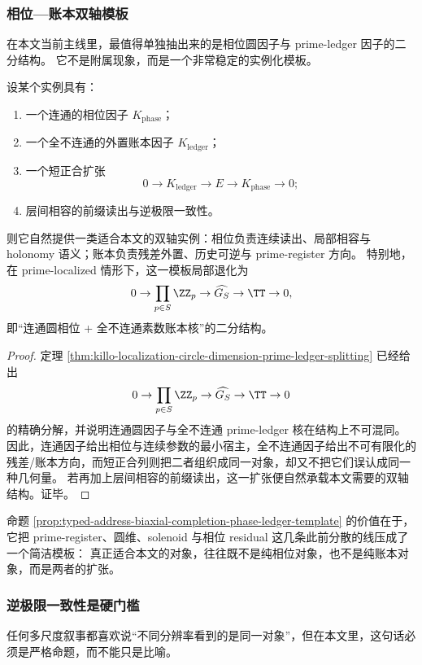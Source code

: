 \subsubsection{相位—账本双轴模板}\label{subsubsec:typed-address-biaxial-completion-phase-ledger-template}
在本文当前主线里，最值得单独抽出来的是相位圆因子与 prime-ledger 因子的二分结构。
它不是附属现象，而是一个非常稳定的实例化模板。

\begin{proposition}[相位—账本双轴模板]\label{prop:typed-address-biaxial-completion-phase-ledger-template}
设某个实例具有：
\begin{enumerate}
  \item 一个连通的相位因子 \(K_{\mathrm{phase}}\)；
  \item 一个全不连通的外置账本因子 \(K_{\mathrm{ledger}}\)；
  \item 一个短正合扩张
  \[
  0\to K_{\mathrm{ledger}}\to E\to K_{\mathrm{phase}}\to 0;
  \]
  \item 层间相容的前缀读出与逆极限一致性。
\end{enumerate}
则它自然提供一类适合本文的双轴实例：相位负责连续读出、局部相容与 holonomy 语义；账本负责残差外置、历史可逆与 prime-register 方向。
特别地，在 prime-localized 情形下，这一模板局部退化为
\[
0\to \prod_{p\in S}\ZZ_p\to \widehat{G_S}\to \TT\to 0,
\]
即“连通圆相位 + 全不连通素数账本核”的二分结构。
\end{proposition}

\begin{proof}
定理 \ref{thm:killo-localization-circle-dimension-prime-ledger-splitting} 已经给出
\[
0\to \prod_{p\in S}\ZZ_p\to \widehat{G_S}\to \TT\to 0
\]
的精确分解，并说明连通圆因子与全不连通 prime-ledger 核在结构上不可混同。
因此，连通因子给出相位与连续参数的最小宿主，全不连通因子给出不可有限化的残差/账本方向，而短正合列则把二者组织成同一对象，却又不把它们误认成同一种几何量。
若再加上层间相容的前缀读出，这一扩张便自然承载本文需要的双轴结构。证毕。
\end{proof}

命题 \ref{prop:typed-address-biaxial-completion-phase-ledger-template} 的价值在于，它把 prime-register、圆维、solenoid 与相位 residual 这几条此前分散的线压成了一个简洁模板：
真正适合本文的对象，往往既不是纯相位对象，也不是纯账本对象，而是两者的扩张。

\subsubsection{逆极限一致性是硬门槛}\label{subsubsec:typed-address-biaxial-completion-inverse-limit-threshold}
任何多尺度叙事都喜欢说“不同分辨率看到的是同一对象”，但在本文里，这句话必须是严格命题，而不能只是比喻。

